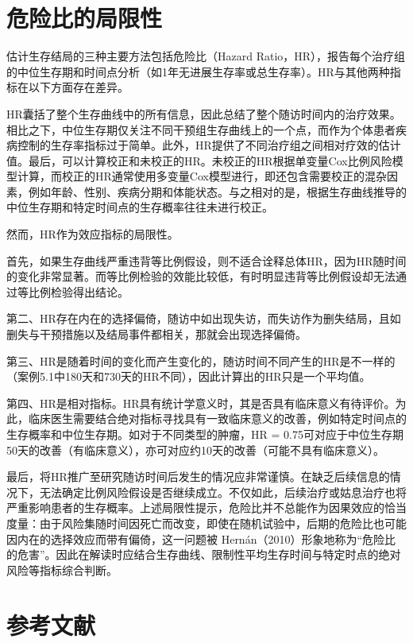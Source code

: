 \documentclass[
  chinese-hans,
  letterpaper,
  DIV=11,
  numbers=noendperiod]{scrreprt}
\begin{document}
\section{危险比的局限性}\label{ux5371ux9669ux6bd4ux7684ux5c40ux9650ux6027}

估计生存结局的三种主要方法包括危险比（Hazard
Ratio，HR），报告每个治疗组的中位生存期和时间点分析（如1年无进展生存率或总生存率）。HR与其他两种指标在以下方面存在差异。

HR囊括了整个生存曲线中的所有信息，因此总结了整个随访时间内的治疗效果。相比之下，中位生存期仅关注不同干预组生存曲线上的一个点，而作为个体患者疾病控制的生存率指标过于简单。此外，HR提供了不同治疗组之间相对疗效的估计值。最后，可以计算校正和未校正的HR。未校正的HR根据单变量Cox比例风险模型计算，而校正的HR通常使用多变量Cox模型进行，即还包含需要校正的混杂因素，例如年龄、性别、疾病分期和体能状态。与之相对的是，根据生存曲线推导的中位生存期和特定时间点的生存概率往往未进行校正。

然而，HR作为效应指标的局限性。

首先，如果生存曲线严重违背等比例假设，则不适合诠释总体HR，因为HR随时间的变化非常显著。而等比例检验的效能比较低，有时明显违背等比例假设却无法通过等比例检验得出结论。

第二、HR存在内在的选择偏倚，随访中如出现失访，而失访作为删失结局，且如删失与干预措施以及结局事件都相关，那就会出现选择偏倚。

第三、HR是随着时间的变化而产生变化的，随访时间不同产生的HR是不一样的（案例5.1中180天和730天的HR不同），因此计算出的HR只是一个平均值。

第四、HR是相对指标。HR具有统计学意义时，其是否具有临床意义有待评价。为此，临床医生需要结合绝对指标寻找具有一致临床意义的改善，例如特定时间点的生存概率和中位生存期。如对于不同类型的肿瘤，HR
=
0.75可对应于中位生存期50天的改善（有临床意义），亦可对应约10天的改善（可能不具有临床意义）。

最后，将HR推广至研究随访时间后发生的情况应非常谨慎。在缺乏后续信息的情况下，无法确定比例风险假设是否继续成立。不仅如此，后续治疗或姑息治疗也将严重影响患者的生存概率。上述局限性提示，危险比并不总能作为因果效应的恰当度量：由于风险集随时间因死亡而改变，即使在随机试验中，后期的危险比也可能因内在的选择效应而带有偏倚，这一问题被
Hernán（2010）形象地称为``危险比的危害''。因此在解读时应结合生存曲线、限制性平均生存时间与特定时点的绝对风险等指标综合判断。

\section{参考文献}\label{ux53c2ux8003ux6587ux732e-4}
\end{document}
